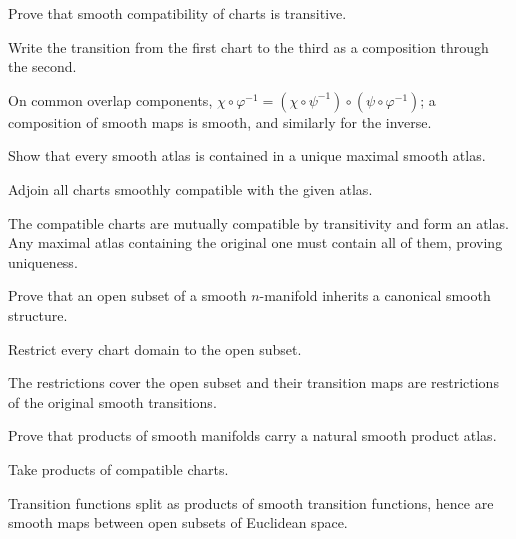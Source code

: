 \begin{exercise}\label{exr:vii02-ped-06}
Prove that smooth compatibility of charts is transitive.
\end{exercise}
\begin{hint}
Write the transition from the first chart to the third as a composition through the second.
\end{hint}
\begin{solution}
On common overlap components, \(\chi\circ\varphi^{-1}=(\chi\circ\psi^{-1})\circ(\psi\circ\varphi^{-1})\); a composition of smooth maps is smooth, and similarly for the inverse.
\end{solution}

\begin{exercise}\label{exr:vii02-ped-07}
Show that every smooth atlas is contained in a unique maximal smooth atlas.
\end{exercise}
\begin{hint}
Adjoin all charts smoothly compatible with the given atlas.
\end{hint}
\begin{solution}
The compatible charts are mutually compatible by transitivity and form an atlas.  Any maximal atlas containing the original one must contain all of them, proving uniqueness.
\end{solution}

\begin{exercise}\label{exr:vii02-ped-08}
Prove that an open subset of a smooth \(n\)-manifold inherits a canonical smooth structure.
\end{exercise}
\begin{hint}
Restrict every chart domain to the open subset.
\end{hint}
\begin{solution}
The restrictions cover the open subset and their transition maps are restrictions of the original smooth transitions.
\end{solution}

\begin{exercise}\label{exr:vii02-ped-09}
Prove that products of smooth manifolds carry a natural smooth product atlas.
\end{exercise}
\begin{hint}
Take products of compatible charts.
\end{hint}
\begin{solution}
Transition functions split as products of smooth transition functions, hence are smooth maps between open subsets of Euclidean space.
\end{solution}

